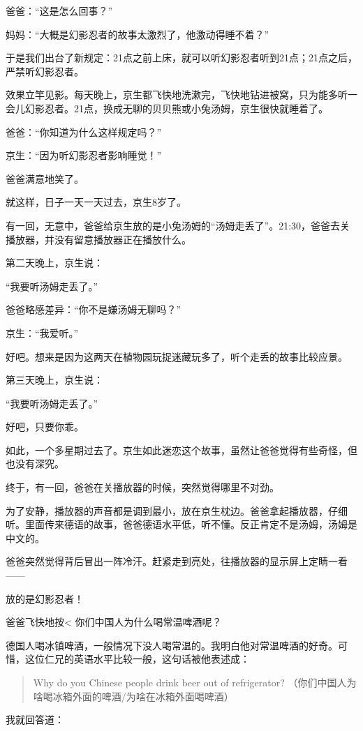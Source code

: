 \documentclass[twoside,openright,headings=optiontohead]{ctexbook} %
\begin{document}
{爸爸：``这是怎么回事？''

妈妈：``大概是幻影忍者的故事太激烈了，他激动得睡不着？''

于是我们出台了新规定：21点之前上床，就可以听幻影忍者听到21点；21点之后，严禁听幻影忍者。

效果立竿见影。每天晚上，京生都飞快地洗漱完，飞快地钻进被窝，只为能多听一会儿幻影忍者。21点，换成无聊的贝贝熊或小兔汤姆，京生很快就睡着了。

爸爸：``你知道为什么这样规定吗？''

京生：``因为听幻影忍者影响睡觉！''

爸爸满意地笑了。

就这样，日子一天一天过去，京生8岁了。

有一回，无意中，爸爸给京生放的是小兔汤姆的``汤姆走丢了''。21:30，爸爸去关播放器，并没有留意播放器正在播放什么。

第二天晚上，京生说：

``我要听汤姆走丢了。''

爸爸略感差异：``你不是嫌汤姆无聊吗？''

京生：``我爱听。''

好吧。想来是因为这两天在植物园玩捉迷藏玩多了，听个走丢的故事比较应景。

第三天晚上，京生说：

``我要听汤姆走丢了。''

好吧，只要你乖。

如此，一个多星期过去了。京生如此迷恋这个故事，虽然让爸爸觉得有些奇怪，但也没有深究。

终于，有一回，爸爸在关播放器的时候，突然觉得哪里不对劲。

为了安静，播放器的声音都是调到最小，放在京生枕边。爸爸拿起播放器，仔细听。里面传来德语的故事，爸爸德语水平低，听不懂。反正肯定不是汤姆，汤姆是中文的。

爸爸突然觉得背后冒出一阵冷汗。赶紧走到亮处，往播放器的显示屏上定睛一看------

放的是幻影忍者！

爸爸飞快地按\textless{} 你们中国人为什么喝常温啤酒呢？

德国人喝冰镇啤酒，一般情况下没人喝常温的。我明白他对常温啤酒的好奇。可惜，这位仁兄的英语水平比较一般，这句话被他表述成：

\begin{quote}
Why do you Chinese people drink beer out of refrigerator?
（你们中国人为啥喝冰箱外面的啤酒/为啥在冰箱外面喝啤酒）
\end{quote}

我就回答道：

}
\end{document}
